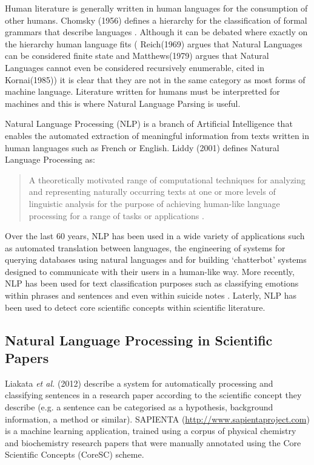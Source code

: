 Human literature is generally written in human languages for the consumption of
other humans. Chomsky (1956) defines a hierarchy for the classification of
formal grammars that describe languages \cite{chomsky1956three}. Although it
can be debated where exactly on the hierarchy human language fits (
Reich(1969)\cite{reich1969finiteness} argues that Natural Languages can be
considered finite state and Matthews(1979)\cite{matthews1979grammatical} argues
that Natural Languages cannot even be considered recursively enumerable, cited
in Kornai(1985)\cite{kornai1985natural}) it is clear that they are not in the same
category as most forms of machine language. Literature written for humans must
be interpretted for machines and this is where Natural Language Parsing is
useful.

Natural Language Processing (NLP)  is a branch of Artificial
Intelligence that enables the automated extraction of meaningful information
from texts written in human languages such as French or English. Liddy (2001)
defines Natural Language Processing as:

\begin{quotation} 
A theoretically motivated range of computational techniques for analyzing and
representing naturally occurring texts at one or more levels of linguistic
analysis for the purpose of achieving human-like language processing for a
range of tasks or applications \cite{liddy2001natural}.  
\end{quotation}

Over the last 60 years, NLP has been used in a wide variety of applications
such as automated translation between languages\cite{hutchins2004first}, the
engineering of systems for querying databases using natural languages
\cite{rao2010natural} and for building `chatterbot' systems designed to
communicate with their users in a human-like way\cite{Alfonsi2006}.
More recently, NLP has been used for text classification purposes such as
classifying emotions within phrases and sentences \cite{Wilson05Polarity} and
even within suicide notes \cite{citeulike:11077287}. Laterly, NLP has been
used to detect core scientific concepts within scientific literature.

\subsection{Natural Language Processing in Scientific Papers}
\label{sec:nlpsapienta}

Liakata \emph{et al.} (2012) describe a system for automatically processing and
classifying sentences in a research paper according to the scientific concept
they describe (e.g. a sentence can be categorised as a hypothesis, background
information, a method or similar)\cite{citeulike:10444769}. SAPIENTA
(\url{http://www.sapientaproject.com}) is a machine learning application,
trained using a corpus of physical chemistry and biochemistry research papers
that were manually annotated using the Core Scientific Concepts
(CoreSC)\cite{LIAKATA10.644} scheme. 

